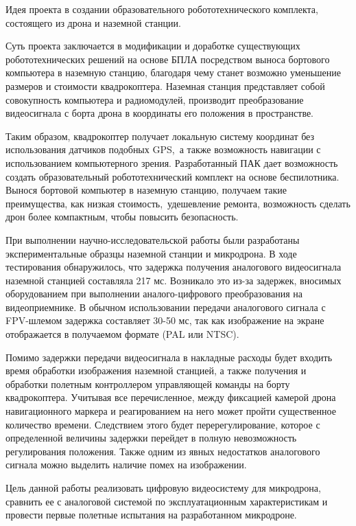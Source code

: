 
Идея проекта в создании образовательного робототехнического комплекта, состоящего из дрона и наземной станции. 

Суть проекта заключается в модификации и доработке существующих робототехнических решений на основе БПЛА посредством выноса бортового компьютера в наземную станцию, благодаря чему станет возможно уменьшение размеров и стоимости квадрокоптера.
Наземная станция представляет собой совокупность компьютера и радиомодулей, производит преобразование видеосигнала с борта дрона в координаты его положения в пространстве.

Таким образом, квадрокоптер получает локальную систему координат без использования датчиков подобных GPS, а также возможность навигации с использованием компьютерного зрения.
Разработанный ПАК дает возможность создать образовательный робототехнический комплект на основе беспилотника. Вынося бортовой компьютер в наземную станцию, получаем такие преимущества, как низкая стоимость, удешевление ремонта, возможность сделать дрон более компактным, чтобы повысить безопасность.

При выполнении научно-исследовательской работы были разработаны экспериментальные образцы наземной станции и микродрона. В ходе тестирования обнаружилось, что задержка получения аналогового видеосигнала наземной станцией составляла 217 мс. Возникало это из-за задержек, вносимых оборудованием при выполнении аналого-цифрового преобразования на видеоприемнике. В обычном использовании передачи аналогового сигнала с FPV-шлемом задержка составляет 30-50 мс, так как изображение на экране отображается в получаемом формате (PAL или NTSC).

Помимо задержки передачи видеосигнала в накладные расходы будет входить время обработки изображения наземной станцией, а также получения и обработки полетным контроллером управляющей команды на борту квадрокоптера. Учитывая все перечисленное, между фиксацией камерой дрона навигационного маркера и реагированием на него может пройти существенное количество времени. Следствием этого будет перерегулирование, которое с определенной величины задержки перейдет в полную невозможность регулирования положения.
Также одним из явных недостатков аналогового сигнала можно выделить наличие помех на изображении.

Цель данной работы реализовать цифровую видеосистему для микродрона, сравнить ее с аналоговой системой по эксплуатационным характеристикам и провести первые полетные испытания на разработанном микродроне.